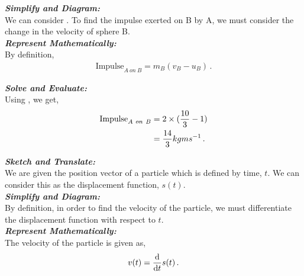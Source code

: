 \begin{subquestions}
\begin{subsubquestions}

\subsubquestion

\textbf{\textit{Simplify and Diagram:}} \\
We can consider . To find the impulse exerted on B by A, we must consider the change in the velocity of sphere B.\\




\textbf{\textit{Represent Mathematically:}} \\
By definition,
\begin{align}
	\text{Impulse}_{A~on~B} = m_B(v_B-u_B) \label{2008M:q5:Impulse} \,.
\end{align}




\textbf{\textit{Solve and Evaluate:}} \\
Using , we get,
\begin{align}
	\text{Impulse}_{A~on~B} & = 2\times (\frac{10}{3}-1) \nonumber \\
						    & = \frac{14}{3} kgms^{-1} \,.
\end{align}

\end{subsubquestions}	


\subquestion

\begin{subsubquestions}
	
\subsubquestion

\textbf{\textit{Sketch and Translate:}} \\
We are given the position vector of a particle which is defined by time, $t$. We can consider this as the displacement function, $s(t)$.\\




\textbf{\textit{Simplify and Diagram:}} \\
By definition, in order to find the velocity of the particle, we must differentiate the displacement function with respect to $t$.\\




\textbf{\textit{Represent Mathematically:}} \\
The velocity of the particle is given as,
\begin{equation}
	v(t) = \frac{\mathrm{d}}{\mathrm{d}t} s(t) \,.
\end{equation}





\end{subsubquestions}
\end{subquestions}
